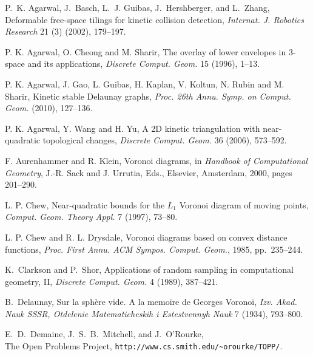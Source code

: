\documentclass[letter,11pt]{article}
\begin{document}
\begin{thebibliography}{10}










P.~K. Agarwal, J.~Basch, L.~J. Guibas, J.~Hershberger, and L.~Zhang,
Deformable free-space tilings for kinetic collision detection,
{\em Internat. J. Robotics Research} 21 (3) (2002), 179--197.

P. K. Agarwal, O. Cheong and M. Sharir, The overlay of lower
envelopes in 3-space and its applications, {\it Discrete Comput.
Geom.} 15 (1996), 1--13.


P. K. Agarwal, J. Gao, L. Guibas, H. Kaplan, V. Koltun, N. Rubin and M. Sharir,
Kinetic stable Delaunay graphs, \textit{Proc. 26th Annu. Symp. on Comput. Geom.} (2010), 127--136.

P. K. Agarwal, Y. Wang and H. Yu,
A 2D kinetic triangulation with near-quadratic topological changes,
\textit{Discrete Comput. Geom.} 36 (2006), 573--592.







F. Aurenhammer and R. Klein,
Voronoi diagrams,
in {\it Handbook of Computational Geometry},
J.-R. Sack and J. Urrutia, Eds.,
Elsevier, Amsterdam, 2000,
pages 201--290.



L. P. Chew,
Near-quadratic bounds for the $L_1$ Voronoi diagram of moving points,
{\em Comput. Geom. Theory Appl.}  7 (1997), 73--80.

L. P. Chew and R. L. Drysdale,
Voronoi diagrams based on convex distance functions,
{\em Proc. First Annu. ACM Sympos. Comput. Geom.}, 1985, pp.~235--244.

K.~Clarkson and P.~Shor, Applications of random sampling in
computational geometry, II, \emph{Discrete Comput. Geom.} 4 (1989),
387--421.



B.~Delaunay,
Sur la sph{\`e}re vide. {A} la memoire de {Georges} {Voronoi},
{\em Izv. Akad. Nauk SSSR, Otdelenie Matematicheskih i Estestvennyh
Nauk} 7 (1934), 793--800.

E.~D.~Demaine, J.~S.~B.~Mitchell, and J.~O'Rourke,\\
The Open Problems Project,
\texttt{http://www.cs.smith.edu/\~{ }orourke/TOPP/}.


\end{thebibliography}
\end{document}
